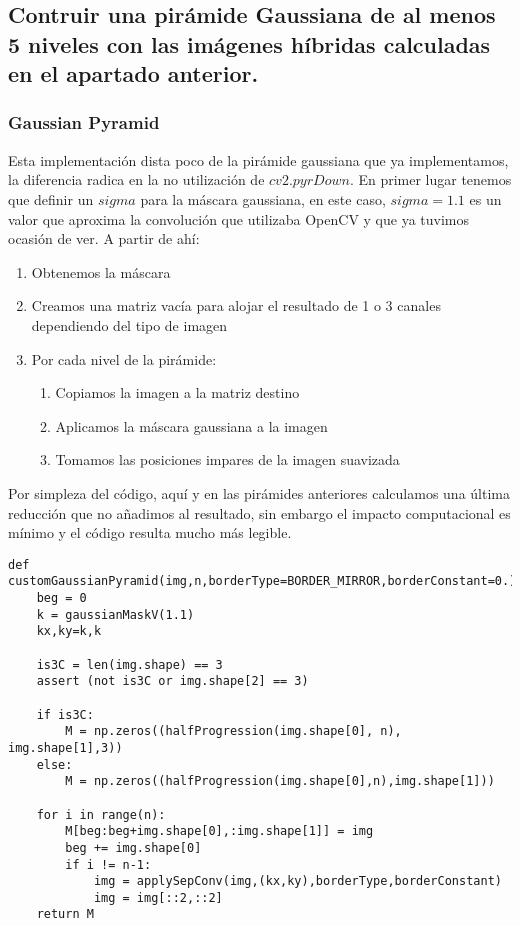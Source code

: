 \documentclass{article}
\begin{document}
\subsection{Contruir una pirámide Gaussiana de al menos 5 niveles con las imágenes híbridas calculadas en el apartado anterior.}

\subsubsection{Gaussian Pyramid}

Esta implementación dista poco de la pirámide gaussiana que ya implementamos, la diferencia radica en la no utilización de $cv2.pyrDown$. En primer lugar tenemos que definir un $sigma$ para la máscara gaussiana, en este caso, $sigma=1.1$ es un valor que aproxima la convolución que utilizaba OpenCV y que ya tuvimos ocasión de ver. A partir de ahí:

\begin{enumerate}
\item Obtenemos la máscara
\item Creamos una matriz vacía para alojar el resultado de 1 o 3 canales dependiendo del tipo de imagen
\item Por cada nivel de la pirámide:
	\begin{enumerate}
		\item Copiamos la imagen a la matriz destino
		\item Aplicamos la máscara gaussiana a la imagen
		\item Tomamos las posiciones impares de la imagen suavizada
	\end{enumerate}
\end{enumerate}

Por simpleza del código, aquí y en las pirámides anteriores calculamos una última reducción que no añadimos al resultado, sin embargo el impacto computacional es mínimo y el código resulta mucho más legible.

\begin{lstlisting}
def customGaussianPyramid(img,n,borderType=BORDER_MIRROR,borderConstant=0.):
    beg = 0
    k = gaussianMaskV(1.1)
    kx,ky=k,k

    is3C = len(img.shape) == 3
    assert (not is3C or img.shape[2] == 3)

    if is3C:
        M = np.zeros((halfProgression(img.shape[0], n), img.shape[1],3))
    else:
        M = np.zeros((halfProgression(img.shape[0],n),img.shape[1]))

    for i in range(n):
        M[beg:beg+img.shape[0],:img.shape[1]] = img
        beg += img.shape[0]
        if i != n-1:
            img = applySepConv(img,(kx,ky),borderType,borderConstant)
            img = img[::2,::2]
    return M
\end{lstlisting}
\end{document}
